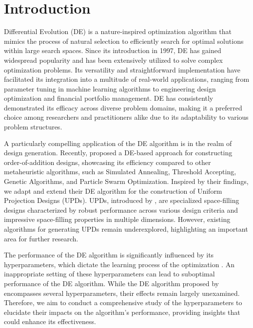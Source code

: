 \documentclass [PhD] {package/uclathes}
\begin{document}
\section{Introduction}



Differential Evolution (DE) is a nature-inspired optimization algorithm that mimics the process of natural selection to efficiently search for optimal solutions within large search spaces. Since its introduction in 1997, DE has gained widespread popularity and has been extensively utilized to solve complex optimization problems. Its versatility and straightforward implementation have facilitated its integration into a multitude of real-world applications, ranging from parameter tuning in machine learning algorithms to engineering design optimization and financial portfolio management. DE has consistently demonstrated its efficacy across diverse problem domains, making it a preferred choice among researchers and practitioners alike due to its adaptability to various problem structures.

A particularly compelling application of the DE algorithm is in the realm of design generation. Recently, \textcite{stokes2023metaheuristic} proposed a DE-based approach for constructing order-of-addition designs, showcasing its efficiency compared to other metaheuristic algorithms, such as Simulated Annealing, Threshold Accepting, Genetic Algorithms, and Particle Swarm Optimization. Inspired by their findings, we adapt and extend their DE algorithm for the construction of Uniform Projection Designs (UPDs). UPDs, introduced by \textcite{sun2019uniform}, are specialized space-filling designs characterized by robust performance across various design criteria and impressive space-filling properties in multiple dimensions. However, existing algorithms for generating UPDs remain underexplored, highlighting an important area for further research.

The performance of the DE algorithm is significantly influenced by its hyperparameters, which dictate the learning process of the optimization \parencite{price2006differential}. An inappropriate setting of these hyperparameters can lead to suboptimal performance of the DE algorithm. While the DE algorithm proposed by \textcite{stokes2023metaheuristic} encompasses several hyperparameters, their effects remain largely unexamined. Therefore, we aim to conduct a comprehensive study of the hyperparameters to elucidate their impacts on the algorithm's performance, providing insights that could enhance its effectiveness.
\end{document}
